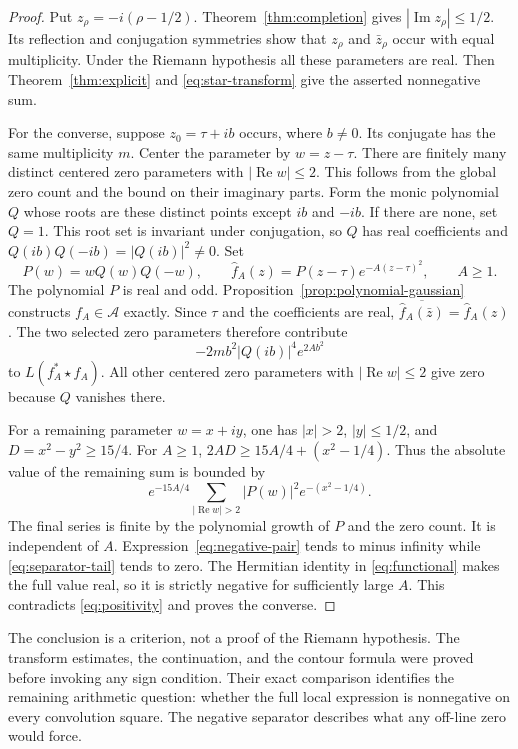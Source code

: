 \documentclass[11pt]{article}
\theoremstyle{definition}
\theoremstyle{remark}
\numberwithin{equation}{section}
\newcommand{\A}{\mathcal A}
\begin{document}
\begin{proof}
Put $z_\rho=-i(\rho-1/2)$.
Theorem~\ref{thm:completion} gives $|\operatorname{Im}z_\rho|\leq1/2$.
Its reflection and conjugation symmetries show that $z_\rho$ and
$\bar z_\rho$ occur with equal multiplicity.
Under the Riemann hypothesis all these parameters are real.
Then Theorem~\ref{thm:explicit} and \eqref{eq:star-transform} give the
asserted nonnegative sum.

For the converse, suppose $z_0=\tau+ib$ occurs, where $b\ne0$.
Its conjugate has the same multiplicity $m$.
Center the parameter by $w=z-\tau$.
There are finitely many distinct centered zero parameters with
$|\operatorname{Re}w|\leq2$.
This follows from the global zero count and the bound on their imaginary
parts.  Form the monic polynomial $Q$ whose roots are these distinct points
except $ib$ and $-ib$.  If there are none, set $Q=1$.
This root set is invariant under conjugation, so $Q$ has real coefficients
and $Q(ib)Q(-ib)=|Q(ib)|^2\ne0$.
Set
\[
 P(w)=wQ(w)Q(-w),\qquad
 \widehat f_A(z)=P(z-\tau)e^{-A(z-\tau)^2},\qquad A\geq1.
\]
The polynomial $P$ is real and odd.
Proposition~\ref{prop:polynomial-gaussian} constructs $f_A\in\A$ exactly.
Since $\tau$ and the coefficients are real,
$\overline{\widehat f_A(\bar z)}=\widehat f_A(z)$.
The two selected zero parameters therefore contribute
\begin{equation}
 -2m b^2|Q(ib)|^4e^{2Ab^2}
 \label{eq:negative-pair}
\end{equation}
to $L(f_A^*\star f_A)$.
All other centered zero parameters with $|\operatorname{Re}w|\leq2$
give zero because $Q$ vanishes there.

For a remaining parameter $w=x+iy$, one has $|x|>2$, $|y|\leq1/2$,
and $D=x^2-y^2\geq15/4$.
For $A\geq1$, $2AD\geq15A/4+(x^2-1/4)$.
Thus the absolute value of the remaining sum is bounded by
\begin{equation}
 e^{-15A/4}
 \sum_{|\operatorname{Re}w|>2}|P(w)|^2e^{-(x^2-1/4)}.
 \label{eq:separator-tail}
\end{equation}
The final series is finite by the polynomial growth of $P$ and the zero
count.  It is independent of $A$.
Expression~\eqref{eq:negative-pair} tends to minus infinity while
\eqref{eq:separator-tail} tends to zero.
The Hermitian identity in \eqref{eq:functional} makes the full value real,
so it is strictly negative for sufficiently large $A$.
This contradicts \eqref{eq:positivity} and proves the converse.
\end{proof}

The conclusion is a criterion, not a proof of the Riemann hypothesis.
The transform estimates, the continuation, and the contour formula were
proved before invoking any sign condition.
Their exact comparison identifies the remaining arithmetic question:
whether the full local expression is nonnegative on every convolution square.
The negative separator describes what any off-line zero would force.
\end{document}
